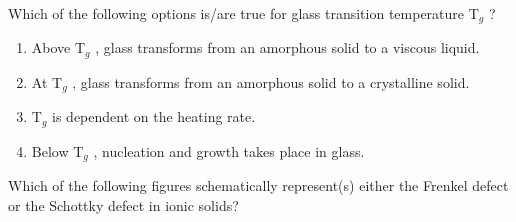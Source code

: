 \item Which of the following options is/are true for glass transition temperature T$_g$ ?

\begin{enumerate}
\item Above T$_g$ , glass transforms from an amorphous solid to a viscous liquid.
\item At T$_g$ , glass transforms from an amorphous solid to a crystalline solid. 
\item T$_g$ is dependent on the heating rate. 
\item Below T$_g$ , nucleation and growth takes place in glass.
\end{enumerate}



\item Which of the following figures schematically represent(s) either the Frenkel defect
or the Schottky defect in ionic solids? 
